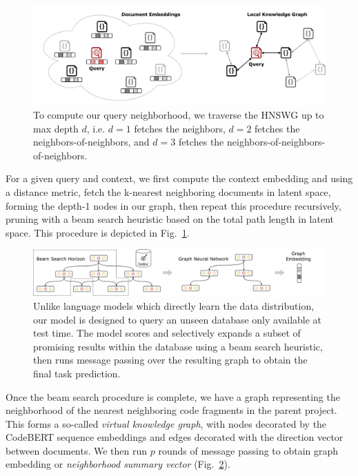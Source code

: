 \documentclass[11pt]{article}
\begin{document}
\begin{figure}[H]
  \centering
  \includegraphics[width=\textwidth]{latent_kg}
  \caption{To compute our query neighborhood, we traverse the HNSWG up to max depth $d$, i.e. $d=1$ fetches the neighbors, $d=2$ fetches the neighbors-of-neighbors, and $d=3$ fetches the neighbors-of-neighbors-of-neighbors.}
  \label{fig:de2kg}
\end{figure}

For a given query and context, we first compute the context embedding and using a distance metric, fetch the k-nearest neighboring documents in latent space, forming the depth-1 nodes in our graph, then repeat this procedure recursively, pruning with a beam search heuristic based on the total path length in latent space. This procedure is depicted in Fig.~\ref{fig:de2kg}.

\begin{figure}[H]
  \centering
  \includegraphics[width=1.05\textwidth]{architecture}
  \caption{Unlike language models which directly learn the data distribution, our model is designed to query an unseen database only available at test time. The model scores and selectively expands a subset of promising results within the database using a beam search heuristic, then runs message passing over the resulting graph to obtain the final task prediction.}
  \label{fig:architecture}
\end{figure}

Once the beam search procedure is complete, we have a graph representing the neighborhood of the nearest neighboring code fragments in the parent project. This forms a so-called \textit{virtual knowledge graph}, with nodes decorated by the CodeBERT sequence embeddings and edges decorated with the direction vector between documents. We then run $p$ rounds of message passing to obtain graph embedding or \textit{neighborhood summary vector} (Fig.~\ref{fig:architecture}).
\end{document}
